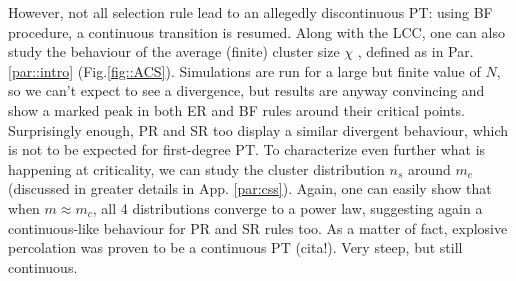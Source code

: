 However, not all selection rule lead to an allegedly discontinuous PT: using BF procedure, a continuous transition is resumed. Along with the LCC, one can also study the behaviour of the average (finite) cluster size $\chi$ , defined as in Par.\ref{par::intro} (Fig.\ref{fig::ACS}). Simulations are run for a large but finite value of $N$, so we can't expect to see a divergence, but results are anyway convincing and show a marked peak in both ER and BF rules around their critical points. Surprisingly enough, PR and SR too display a similar divergent behaviour, which is not to be expected for first-degree PT. To characterize even further what is happening at criticality, we can study the cluster distribution $n_s$ around $m_c$ (discussed in greater details in App. \ref{par:css}). Again, one can easily show that when $m \approx m_c$, all 4 distributions converge to a power law, suggesting again a continuous-like behaviour for PR and SR rules too. As a matter of fact, explosive percolation was proven to be a continuous PT (cita!). Very steep, but still continuous.

